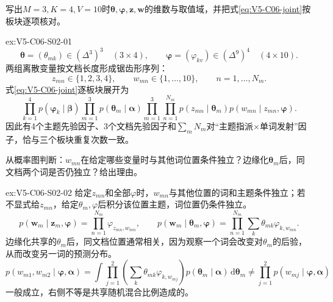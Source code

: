 \begin{SLChapterExercisePairSection}
\SLLectureSupplementExercises

\begin{exercise}\label{ex:V5-C06-S02-01}
写出$M=3,K=4,V=10$时$\boldsymbol\theta,\boldsymbol\varphi,\boldsymbol z,\boldsymbol w$的维数与取值域，并把式\eqref{eq:V5-C06-joint}按板块逐项核对。
\end{exercise}
\ifSLFullEdition
{}\label{sol:V5-C06-S02-01}
\begin{chapterexercisesolution}{ex:V5-C06-S02-01}
\nopagebreak[4]
\[
\boldsymbol\theta=(\theta_{mk})\in(\Delta^3)^3
\quad(3\times4),\qquad
\boldsymbol\varphi=(\varphi_{kv})\in(\Delta^9)^4
\quad(4\times10).
\]
两组离散变量按文档长度形成锯齿形序列：
\[
z_{mn}\in\{1,2,3,4\},\qquad
w_{mn}\in\{1,\ldots,10\},\qquad
n=1,\ldots,N_m.
\]
式\eqref{eq:V5-C06-joint}逐板块展开为
\[
\prod_{k=1}^{4}p(\boldsymbol\varphi_k\mid\boldsymbol\beta)
\prod_{m=1}^{3}p(\boldsymbol\theta_m\mid\boldsymbol\alpha)
\prod_{m=1}^{3}\prod_{n=1}^{N_m}
p(z_{mn}\mid\boldsymbol\theta_m)
p(w_{mn}\mid z_{mn},\boldsymbol\varphi).
\]
因此有4个主题先验因子、3个文档先验因子和$\sum_mN_m$对“主题指派×单词发射”因子，恰与三个板块重复次数一致。
\end{chapterexercisesolution}
\fi

\begin{exercise}\label{ex:V5-C06-S02-02}
从概率图判断：$w_{mn}$在给定哪些变量时与其他词位置条件独立？边缘化$\boldsymbol\theta_m$后，同文档两个词是否仍独立？给出理由。
\end{exercise}
\ifSLFullEdition
{}\label{sol:V5-C06-S02-02}
\begin{chapterexercisesolution}{ex:V5-C06-S02-02}
\nopagebreak[4]
给定$z_{mn}$和全部$\varphi$时，$w_{mn}$与其他位置的词和主题条件独立；若不显式给$z_{mn}$，给定$\theta_m,\varphi$后积分该位置主题，词位置仍条件独立。
\[
p(\boldsymbol w_m\mid\boldsymbol z_m,\boldsymbol\varphi)
=\prod_{n=1}^{N_m}\varphi_{z_{mn},w_{mn}},\qquad
p(\boldsymbol w_m\mid\boldsymbol\theta_m,\boldsymbol\varphi)
=\prod_{n=1}^{N_m}\sum_k\theta_{mk}\varphi_{k,w_{mn}}.
\]
边缘化共享的$\theta_m$后，同文档位置通常相关，因为观察一个词会改变对$\theta_m$的后验，从而改变另一词的预测分布。
\[
p(w_{m1},w_{m2}\mid\boldsymbol\varphi,\boldsymbol\alpha)
=\int
\prod_{j=1}^{2}\left(\sum_k\theta_{mk}\varphi_{k,w_{mj}}\right)
p(\boldsymbol\theta_m\mid\boldsymbol\alpha)\,
\mathrm d\boldsymbol\theta_m
\ne
\prod_{j=1}^{2}p(w_{mj}\mid\boldsymbol\varphi,\boldsymbol\alpha)
\]
一般成立，右侧不等是共享随机混合比例造成的。
\end{chapterexercisesolution}
\fi


\end{SLChapterExercisePairSection}
